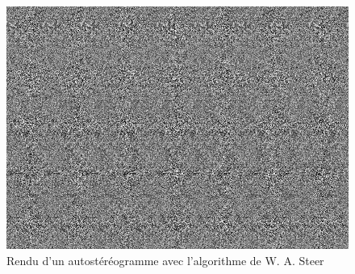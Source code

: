 \begin{figure}[h]
	\centering
	\includegraphics[scale=0.6]{autoste2.png}
	\caption{\label{fig:autoste2} Rendu d'un autostéréogramme avec l'algorithme de W. A. Steer \protect}
\end{figure}
